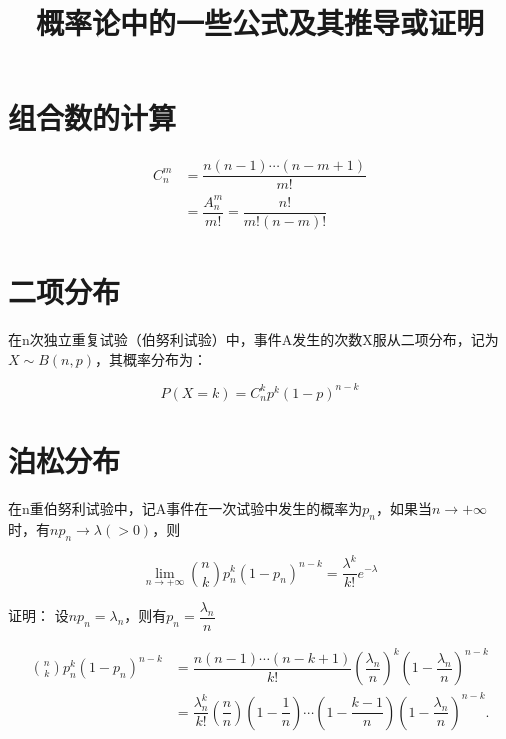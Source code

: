 \documentclass[a4paper, 12pt, draft]{article}
\title{概率论中的一些公式及其推导或证明}
\author{}
\date{}
\begin{document}
\maketitle


    \section{组合数的计算} 

    \begin{equation*}
        \begin{aligned}
            C_{n}^{m} &= \dfrac{n(n-1) \cdots (n - m + 1)}{m!} \\
                      &= \dfrac{A_n^m}{m!} = \dfrac{n!}{m!(n-m)!}
        \end{aligned}
    \end{equation*}


    \section{二项分布}
    在n次独立重复试验（伯努利试验）中，事件A发生的次数X服从二项分布，记为$X \sim B(n, p)$，其概率分布为：
    
    \begin{equation*}
    P(X=k) = C_n^k p^k (1-p)^{n-k}
    \end{equation*}


    \section{泊松分布}
    在n重伯努利试验中，记A事件在一次试验中发生的概率为$p_n$，如果当$n \to + \infty$时，有$np_n \to \lambda(>0)$，则

    \begin{equation*}
    \lim_{n \to + \infty} \binom{n}{k} p_n^k (1-p_n)^{n-k} = \dfrac{\lambda^k}{k!} e^{-\lambda}
    \end{equation*}

    证明：
    设$np_{n} = \lambda_{n}$，则有$p_n=\dfrac{\lambda_{n}}{n}$

    \begin{equation*}
    \begin{aligned}
        \binom{n}{k} p_n^k (1-p_n)^{n-k} &= \dfrac{n(n-1) \cdots (n-k+1)}{k!} \left( \dfrac{\lambda_n}{n} \right)^{k} \left( 1 - \dfrac{\lambda_n}{n} \right)^{n-k} \\
        &= \dfrac{\lambda_n^{k}}{k!} \left( \dfrac{n}{n}\right)\left( 1-\dfrac{1}{n} \right) \cdots \left( 1-\dfrac{k-1}{n} \right)\left( 1 - \dfrac{\lambda_n}{n} \right)^{n-k} .
    \end{aligned}
    \end{equation*}
\end{document}
